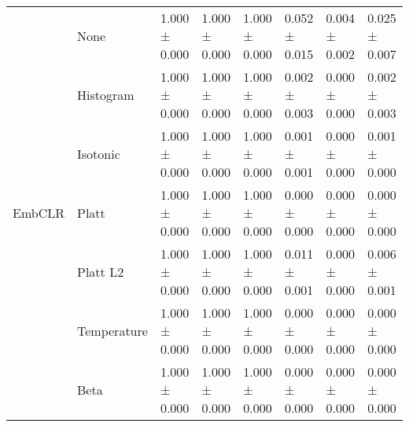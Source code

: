 \begin{tabular}{llllllll}
\cline{1-8}
\multirow[t]{7}{*}{EmbCLR} & None & 1.000 ± 0.000 & 1.000 ± 0.000 & 1.000 ± 0.000 & 0.052 ± 0.015 & 0.004 ± 0.002 & 0.025 ± 0.007 \\
 & Histogram & 1.000 ± 0.000 & 1.000 ± 0.000 & 1.000 ± 0.000 & 0.002 ± 0.003 & 0.000 ± 0.000 & 0.002 ± 0.003 \\
 & Isotonic & 1.000 ± 0.000 & 1.000 ± 0.000 & 1.000 ± 0.000 & 0.001 ± 0.001 & 0.000 ± 0.000 & 0.001 ± 0.000 \\
 & Platt & 1.000 ± 0.000 & 1.000 ± 0.000 & 1.000 ± 0.000 & 0.000 ± 0.000 & 0.000 ± 0.000 & 0.000 ± 0.000 \\
 & Platt L2 & 1.000 ± 0.000 & 1.000 ± 0.000 & 1.000 ± 0.000 & 0.011 ± 0.001 & 0.000 ± 0.000 & 0.006 ± 0.001 \\
 & Temperature & 1.000 ± 0.000 & 1.000 ± 0.000 & 1.000 ± 0.000 & 0.000 ± 0.000 & 0.000 ± 0.000 & 0.000 ± 0.000 \\
 & Beta & 1.000 ± 0.000 & 1.000 ± 0.000 & 1.000 ± 0.000 & 0.000 ± 0.000 & 0.000 ± 0.000 & 0.000 ± 0.000 \\
\cline{1-8}
\bottomrule
\end{tabular}
